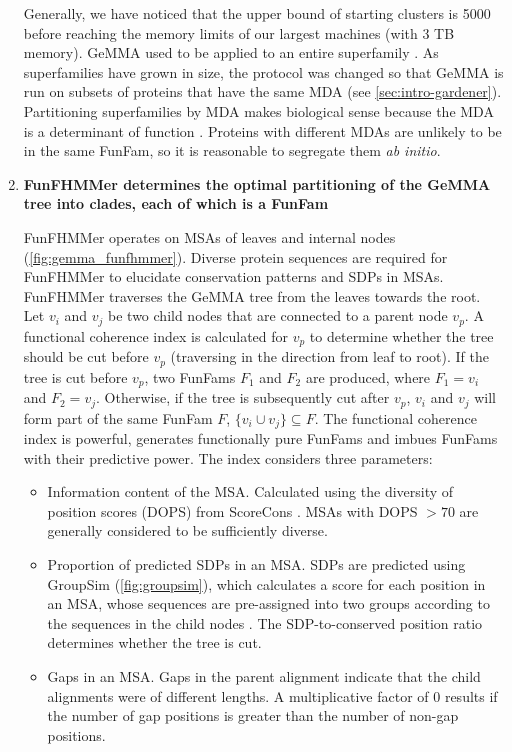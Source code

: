 \begin{enumerate}
        Generally, we have noticed that the upper bound of starting clusters is \num{5000} before reaching the memory limits of our largest machines (with $3$ TB memory). GeMMA used to be applied to an entire superfamily \cite{Lee2009}. As superfamilies have grown in size, the protocol was changed so that GeMMA is run on subsets of proteins that have the same MDA (see \ref{sec:intro-gardener}). Partitioning superfamilies by MDA makes biological sense because the MDA is a determinant of function \cite{Yu2019,Lees2014,Bashton2007}. Proteins with different MDAs are unlikely to be in the same FunFam, so it is reasonable to segregate them \emph{ab initio}.

    \item
        \textbf{FunFHMMer \cite{Das2015b} determines the optimal partitioning of the GeMMA tree into clades, each of which is a FunFam}

        FunFHMMer operates on MSAs of leaves and internal nodes (\ref{fig:gemma_funfhmmer}). Diverse protein sequences are required for FunFHMMer to elucidate conservation patterns and SDPs in MSAs. FunFHMMer traverses the GeMMA tree from the leaves towards the root. Let $v_i$ and $v_j$ be two child nodes that are connected to a parent node $v_p$. A functional coherence index is calculated for $v_p$ to determine whether the tree should be cut before $v_p$ (traversing in the direction from leaf to root). If the tree is cut before $v_p$, two FunFams $F_1$ and $F_2$ are produced, where $F_1 = v_i$ and $F_2 = v_j$. Otherwise, if the tree is subsequently cut after $v_p$, $v_i$ and $v_j$ will form part of the same FunFam $F$, $\{v_i \cup v_j\} \subseteq F$. The functional coherence index is powerful, generates functionally pure FunFams and imbues FunFams with their predictive power. The index considers three parameters:

        \begin{itemize}
            \item
                Information content of the MSA. Calculated using the diversity of position scores (DOPS) from ScoreCons \cite{Valdar2002}. MSAs with DOPS $> 70$ are generally considered to be sufficiently diverse.
            \item
                Proportion of predicted SDPs in an MSA. SDPs are predicted using GroupSim (\ref{fig:groupsim}), which calculates a score for each position in an MSA, whose sequences are pre-assigned into two groups according to the sequences in the child nodes \cite{Capra2008}. The SDP-to-conserved position ratio determines whether the tree is cut.
            \item
                Gaps in an MSA. Gaps in the parent alignment indicate that the child alignments were of different lengths. A multiplicative factor of $0$ results if the number of gap positions is greater than the number of non-gap positions.
        \end{itemize}


\end{enumerate}
